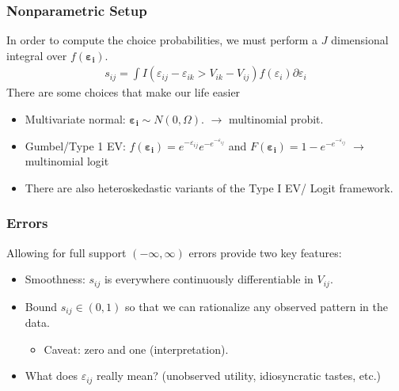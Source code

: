 \begin{frame}
\frametitle{Nonparametric Setup}
In order to compute the choice probabilities, we must perform a $J$ dimensional integral over $f(\boldsymbol{\varepsilon_i})$.
\begin{align*}
s_{ij} =  \int I( \varepsilon_{ij}-\varepsilon_{ik} > V_{ik} - V_{ij} ) f( \varepsilon_i) \partial \varepsilon_i
\end{align*}
There are some choices that make our life easier
\begin{itemize}
\item Multivariate normal: $\boldsymbol{\varepsilon_i} \sim N(0,\Omega)$. $\longrightarrow$ \alert{ multinomial probit}.
\item Gumbel/Type 1 EV: $f(\boldsymbol{\varepsilon_i}) = e^{-\varepsilon_{ij}}  e^{-e^{-\varepsilon_{ij}}}  $ and $F(\boldsymbol{\varepsilon_i}) = 1- e^{-e^{-\varepsilon_{ij}}}$ $\longrightarrow$ \alert{multinomial logit}
\item There are also heteroskedastic variants of the Type I EV/ Logit framework.
\end{itemize}
\end{frame}

\begin{frame}
\frametitle{Errors}
Allowing for full support $(-\infty, \infty)$ errors provide two key features:
\begin{itemize}
\item Smoothness: $s_{ij}$ is everywhere continuously differentiable in $V_{ij}$.
\item Bound $s_{ij} \in (0,1)$ so that we can rationalize any observed pattern in the data.
\begin{itemize}
\item Caveat: zero and one (interpretation).
\end{itemize}
\item What does $\varepsilon_{ij}$ really mean? (unobserved utility, idiosyncratic tastes, etc.)
\end{itemize}
\end{frame}

